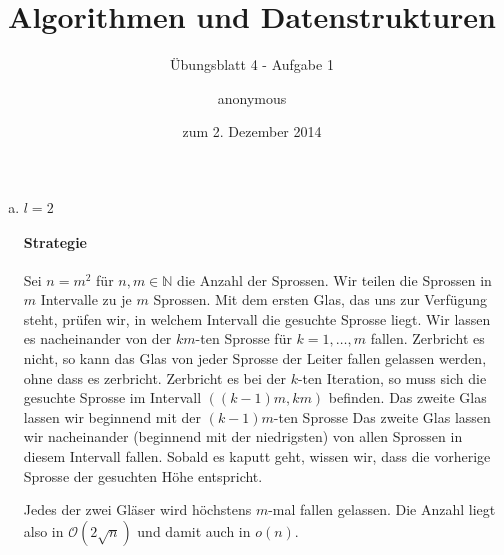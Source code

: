 \documentclass[a4paper]{scrartcl}
\title{Algorithmen und Datenstrukturen}
\subtitle{Übungsblatt 4 - Aufgabe 1}
\author{
    anonymous
}
\date{zum 2. Dezember 2014}
\begin{document}
\maketitle

\begin{enumerate}[(a)]
    \item $l=2$
        \paragraph{Strategie}
        Sei $n = m^2$ für $n, m \in \mathbb{N}$ die Anzahl der Sprossen.
        Wir teilen die Sprossen in $m$ Intervalle zu je $m$ Sprossen.
        Mit dem ersten Glas, das uns zur Verfügung steht, prüfen wir, in
        welchem Intervall die gesuchte Sprosse liegt.
        Wir lassen es nacheinander von der $km$-ten Sprosse für
        $k = 1, \ldots, m$ fallen.
        Zerbricht es nicht, so kann das Glas von jeder Sprosse der Leiter
        fallen gelassen werden, ohne dass es zerbricht.
        Zerbricht es bei der $k$-ten Iteration, so muss sich die gesuchte
        Sprosse im Intervall $\left( (k-1)m, km \right)$ befinden.
        Das zweite Glas lassen wir beginnend mit der $(k-1)m$-ten Sprosse
        Das zweite Glas lassen wir nacheinander (beginnend mit der niedrigsten)
        von allen Sprossen in diesem Intervall fallen.
        Sobald es kaputt geht, wissen wir, dass die vorherige Sprosse der
        gesuchten Höhe entspricht.

        Jedes der zwei Gläser wird höchstens $m$-mal fallen gelassen.
        Die Anzahl liegt also in $\mathcal{O}(2\sqrt{n})$ und damit auch in
        $o(n)$.






\end{enumerate}
\end{document}
